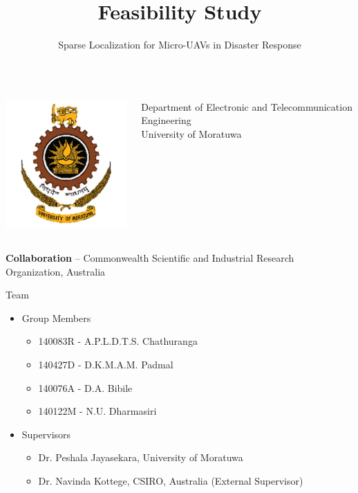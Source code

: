 \documentclass[xcolor=table]{beamer}
\title{Feasibility Study}
\subtitle{Sparse Localization for Micro-UAVs in Disaster Response}
\date{}
\begin{document}
\begin{frame}
  \titlepage
  \begin{columns}
  	\begin{columns}
			\begin{center}
			\includegraphics[scale=0.15]{UoM_Logo.png}
			\end{center}
			\begin{footnotesize}
			\begin{center}
			Department of Electronic and Telecommunication Engineering\\
			University of Moratuwa
			\end{center}
			\end{footnotesize}
	  \end{columns}
  \end{columns}
  
  \begin{center}
    \begin{tiny}
    \textbf{Collaboration} – Commonwealth Scientific and Industrial Research Organization, Australia
    \end{tiny}
  \end{center}  
\end{frame}

\begin{frame}{Team}
  \begin{itemize}
  \item Group Members
	\begin{itemize}
	\item 140083R - A.P.L.D.T.S. Chathuranga
	\item 140427D - D.K.M.A.M. Padmal
	\item 140076A - D.A. Bibile
	\item 140122M - N.U. Dharmasiri
	\end{itemize}
  \item Supervisors
	\begin{itemize}
	\item Dr. Peshala Jayasekara, University of Moratuwa
	\item Dr. Navinda Kottege, CSIRO, Australia (External Supervisor)
	\end{itemize}
  \end{itemize}
\end{frame}
\end{document}
